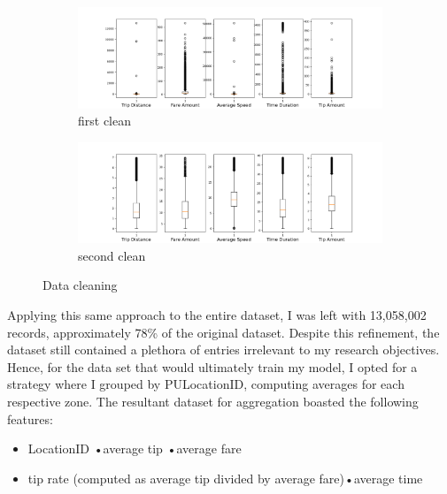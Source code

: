 \documentclass[11pt]{article}
\begin{document}
\begin{figure}[h]
    \centering
    
    \begin{subfigure}[b]{0.45\textwidth}
        \includegraphics[width=\linewidth]{plots/first clean.png}
        \caption{first clean}
        \label{fig:figure1_sub1}
    \end{subfigure}
    \hfill 
    \begin{subfigure}[b]{0.45\textwidth}
        \includegraphics[width=\linewidth]{plots/second clean.png}
        \caption{second clean}
        \label{fig:figure2_sub2}
    \end{subfigure}
    
    \caption{Data cleaning}
    \label{fig:both_figures}
\end{figure}
Applying this same approach to the entire dataset, I was left with 13,058,002 records, approximately 78\% of the original dataset. Despite this refinement, the dataset still contained a plethora of entries irrelevant to my research objectives. Hence, for the data set that would ultimately train my model, I opted for a strategy where I grouped by PULocationID, computing averages for each respective zone. The resultant dataset for aggregation boasted the following features: 

\begin{itemize} 
    \item LocationID \quad\quad\quad •average tip  \quad\quad\quad•average fare
    \item tip rate (computed as average tip divided by average fare)\quad•average time
\end{itemize}
\end{document}
